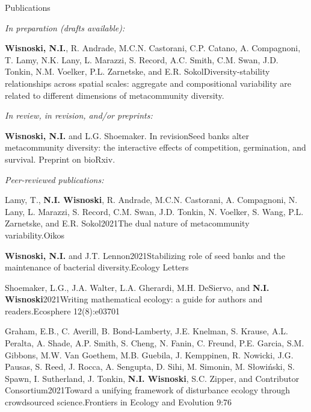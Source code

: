 \documentclass{resume} %
\begin{document}
\begin{rhangSection}{Publications}

{\it In preparation (drafts available):}

\begin{Prep}{{\bf Wisnoski, N.I.}, R. Andrade, M.C.N. Castorani, C.P. Catano, A. Compagnoni, T. Lamy, N.K. Lany, L. Marazzi, S. Record, A.C. Smith, C.M. Swan, J.D. Tonkin, N.M. Voelker, P.L. Zarnetske, and E.R. Sokol}{Diversity-stability relationships across spatial scales: aggregate and compositional variability are related to different dimensions of metacommunity diversity.}
\end{Prep}

\bigskip

{\it In review, in revision, and/or preprints:}

\begin{Prep}{{\bf Wisnoski, N.I.} and L.G. Shoemaker. In revision}{Seed banks alter metacommunity diversity: the interactive effects of competition, germination, and survival. Preprint on bioRxiv.} 
\end{Prep}


\bigskip


{\it Peer-reviewed publications: }

\begin{Publication}{Lamy, T., {\bf N.I. Wisnoski}, R. Andrade, M.C.N. Castorani, A. Compagnoni, N. Lany, L. Marazzi, S. Record, C.M. Swan, J.D. Tonkin, N. Voelker, S. Wang, P.L. Zarnetske, and E.R. Sokol}{2021}{The dual nature of metacommunity variability.}{Oikos}
\end{Publication}

\begin{Publication}{{\bf Wisnoski, N.I.} and J.T. Lennon}{2021}{Stabilizing role of seed banks and the maintenance of bacterial diversity.}{Ecology Letters}
\end{Publication}

\begin{Publication}{Shoemaker, L.G., J.A. Walter, L.A. Gherardi, M.H. DeSiervo, and {\bf N.I. Wisnoski}}{2021}{Writing mathematical ecology: a guide for authors and readers.}{Ecosphere 12(8):e03701}
\end{Publication}

\begin{Publication}{Graham, E.B., C. Averill, B. Bond-Lamberty, J.E. Knelman, S. Krause, A.L. Peralta, A. Shade, A.P. Smith, S. Cheng, N. Fanin, C. Freund, P.E. Garcia, S.M. Gibbons, M.W. Van Goethem, M.B. Guebila, J. Kemppinen, R. Nowicki, J.G. Pausas, S. Reed, J. Rocca, A. Sengupta, D. Sihi, M. Simonin, M. Słowiński, S. Spawn, I. Sutherland, J. Tonkin, {\bf N.I. Wisnoski}, S.C. Zipper, and Contributor Consortium}{2021}{Toward a unifying framework of disturbance ecology through crowdsourced science.}{Frontiers in Ecology and Evolution 9:76}
\end{Publication}


\end{rhangSection}
\end{document}
